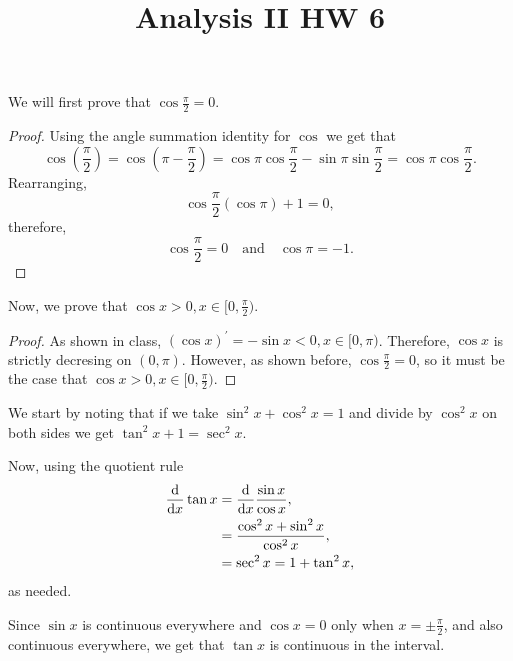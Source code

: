 \documentclass[twoside]{article}
\title{Analysis II HW 6}
\begin{document}
    \maketitle

    We will first prove that $\cos \frac{\pi}{2} = 0$.
    \begin{proof}
        Using the angle summation identity for $\cos$ we get that 
        \begin{equation*}
            \cos(\frac{\pi}{2}) = \cos(\pi - \frac{\pi}{2})
            = \cos \pi \cos \frac{\pi}{2} - \sin \pi \sin \frac{\pi}{2}
            = \cos \pi \cos \frac{\pi}{2}.
        \end{equation*}
        Rearranging,
        \begin{equation*}
            \cos \frac{\pi}{2} (\cos \pi) + 1 = 0,
        \end{equation*}
        therefore,
        \begin{equation*}
            \cos \frac{\pi}{2} = 0 \quad \text{and} \quad \cos \pi = -1.
        \end{equation*}
    \end{proof}

    Now, we prove that $\cos x > 0, x \in [0, \frac{\pi}{2})$.
    \begin{proof}
        As shown in class, $(\cos x)^{\prime} = -\sin x < 0, x \in [0, \pi)$.
        Therefore, $\cos x$ is strictly decresing on $(0, \pi)$.
        However, as shown before, $\cos \frac{\pi}{2} = 0$, so it must be the case that 
        $\cos x > 0, x \in [0, \frac{\pi}{2})$.
    \end{proof}

    We start by noting that if we take $\sin^{2} x + \cos^{2} x = 1$ and divide by 
    $\cos^{2}x$ on both sides we get $\tan^{2} x + 1 = \sec^{2} x$.

    Now, using the quotient rule
    \begin{align*}
        \dv{}{x}\tan x
        &= \dv{}{x} \frac{\sin x}{\cos x},\\ 
        &= \frac{\cos^{2} x + \sin^{2} x}{\cos^{2} x},\\ 
        &= \sec^{2}x = 1 + \tan^{2} x,
    \end{align*}
    as needed.

    Since $\sin x$ is continuous everywhere and $\cos x = 0$ only when $x = \pm \frac{\pi}{2}$,
    and also continuous everywhere, we get that $\tan x$ is continuous in the interval.
\end{document}
